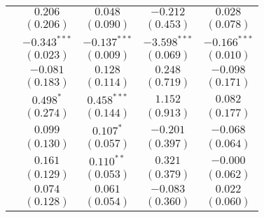 \begin{table}
\begin{center}
\begin{tabular}{l c c c c}
                                                 & $0.206$                      & $0.048$        & $-0.212$                      & $0.028$        \\
                                                 & $(0.206)$                    & $(0.090)$      & $(0.453)$                     & $(0.078)$      \\
                                                 & $-0.343^{***}$               & $-0.137^{***}$ & $-3.598^{***}$                & $-0.166^{***}$ \\
                                                 & $(0.023)$                    & $(0.009)$      & $(0.069)$                     & $(0.010)$      \\
                                                 & $-0.081$                     & $0.128$        & $0.248$                       & $-0.098$       \\
                                                 & $(0.183)$                    & $(0.114)$      & $(0.719)$                     & $(0.171)$      \\
                                                 & $0.498^{*}$                  & $0.458^{***}$  & $1.152$                       & $0.082$        \\
                                                 & $(0.274)$                    & $(0.144)$      & $(0.913)$                     & $(0.177)$      \\
                                                 & $0.099$                      & $0.107^{*}$    & $-0.201$                      & $-0.068$       \\
                                                 & $(0.130)$                    & $(0.057)$      & $(0.397)$                     & $(0.064)$      \\
                                                 & $0.161$                      & $0.110^{**}$   & $0.321$                       & $-0.000$       \\
                                                 & $(0.129)$                    & $(0.053)$      & $(0.379)$                     & $(0.062)$      \\
                                                 & $0.074$                      & $0.061$        & $-0.083$                      & $0.022$        \\
                                                 & $(0.128)$                    & $(0.054)$      & $(0.360)$                     & $(0.060)$      \\

\end{tabular}
\end{center}
\end{table}
